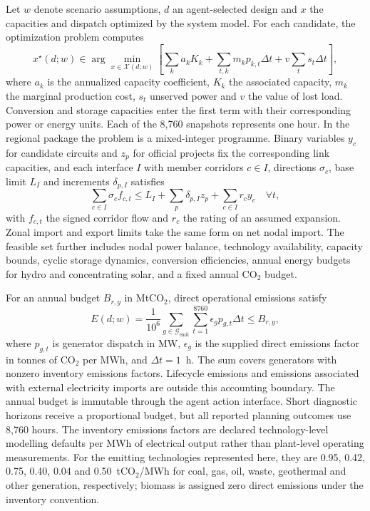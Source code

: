 \documentclass[pdflatex,sn-nature]{sn-jnl}
\begin{document}
Let $w$ denote scenario assumptions, $d$ an agent-selected design and $x$ the capacities and dispatch optimized by the system model. For each candidate, the optimization problem computes
\begin{equation}
x^\star(d;w)\in\arg\min_{x\in\mathcal{X}(d;w)}
\left[\sum_k a_k K_k+\sum_{t,k}m_k p_{k,t}\Delta t
+v\sum_t s_t\Delta t\right],
\label{eq:lp}
\end{equation}
where $a_k$ is the annualized capacity coefficient, $K_k$ the associated capacity, $m_k$ the marginal production cost, $s_t$ unserved power and $v$ the value of lost load. Conversion and storage capacities enter the first term with their corresponding power or energy units. Each of the 8,760 snapshots represents one hour. In the regional package the problem is a mixed-integer programme. Binary variables $y_c$ for candidate circuits and $z_p$ for official projects fix the corresponding link capacities, and each interface $I$ with member corridors $c\in I$, directions $\sigma_c$, base limit $L_I$ and increments $\delta_{p,I}$ satisfies
\begin{equation}
\sum_{c\in I}\sigma_c f_{c,t}\le L_I+\sum_{p}\delta_{p,I}z_p+\sum_{c\in I}r_c y_c\quad\forall t,
\label{eq:interface}
\end{equation}
with $f_{c,t}$ the signed corridor flow and $r_c$ the rating of an assumed expansion. Zonal import and export limits take the same form on net nodal import. The feasible set further includes nodal power balance, technology availability, capacity bounds, cyclic storage dynamics, conversion efficiencies, annual energy budgets for hydro and concentrating solar, and a fixed annual CO$_2$ budget.

For an annual budget $B_{r,y}$ in MtCO$_2$, direct operational emissions satisfy
\begin{equation}
E(d;w)=\frac{1}{10^6}\sum_{g\in\mathcal{G}_{\mathrm{emit}}}\sum_{t=1}^{8760}
\epsilon_g p_{g,t}\Delta t\leq B_{r,y},
\label{eq:operational-carbon-budget}
\end{equation}
where $p_{g,t}$ is generator dispatch in MW, $\epsilon_g$ is the supplied direct emissions factor in tonnes of CO$_2$ per MWh, and $\Delta t=1$~h. The sum covers generators with nonzero inventory emissions factors. Lifecycle emissions and emissions associated with external electricity imports are outside this accounting boundary. The annual budget is immutable through the agent action interface. Short diagnostic horizons receive a proportional budget, but all reported planning outcomes use 8,760 hours. The inventory emissions factors are declared technology-level modelling defaults per MWh of electrical output rather than plant-level operating measurements. For the emitting technologies represented here, they are 0.95, 0.42, 0.75, 0.40, 0.04 and 0.50~tCO$_2$/MWh for coal, gas, oil, waste, geothermal and other generation, respectively; biomass is assigned zero direct emissions under the inventory convention.
\end{document}
